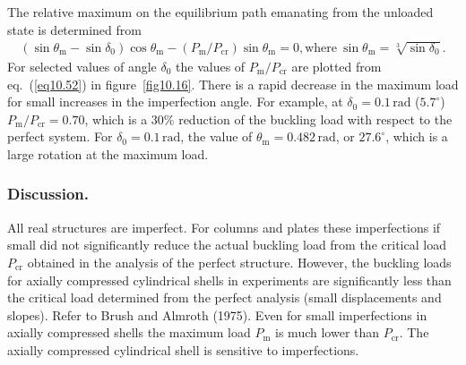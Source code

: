 \documentclass{AeroStructure-ERJohnson}
\begin{document}
The relative maximum on the equilibrium path emanating from the unloaded state is determined from
\begin{align}\label{eq10.52}
\left(\sin \theta_{\mathrm{m}}-\sin \delta_{0}\right) \cos \theta_{\mathrm{m}}-\left(P_{\mathrm{m}} / P_{\mathrm{cr}}\right) \sin \theta_{\mathrm{m}}=0, \text{where}\ \sin \theta_{\mathrm{m}}=\sqrt[3]{\sin \delta_{0}}.
\end{align}
For selected values of angle $\delta_{0}$ the values of $P_{\mathrm{m}} / P_{\mathrm{cr}}$ are plotted from eq.~(\ref{eq10.52}) in figure~\ref{fig10.16}. There is a rapid decrease in the maximum load for small increases in the imperfection angle. For example, at $\delta_{0}=0.1\,\mathrm{rad}$ ($5.7^{\circ}$) $P_{\mathrm{m}} / P_{\mathrm{cr}}=0.70$, which is a 30\% reduction of the buckling load with respect to the perfect system. For $\delta_{0}=0.1\,\mathrm{rad}$, the value of $\theta_{\mathrm{m}}=0.482\,\mathrm{rad}$, or $27.6^{\circ}$, which is a large rotation at the maximum load.

{\def\thefigure{10.16}
}
\vspace*{-1\baselineskip}

\subsubsection{Discussion.} All real structures are imperfect. For columns and plates these imperfections if small did not significantly reduce the actual buckling load from the critical load $P_{\mathrm{cr}}$ obtained in the analysis of the perfect structure. However, the buckling loads for axially compressed cylindrical shells in experiments are significantly less than the critical load determined from the perfect analysis (small displacements and slopes). Refer to Brush and Almroth (1975). Even for small imperfections in axially compressed shells the maximum load $P_{\mathrm{m}}$ is much lower than $P_{\mathrm{cr}}$. The axially compressed cylindrical shell is sensitive to imperfections.
\end{document}
